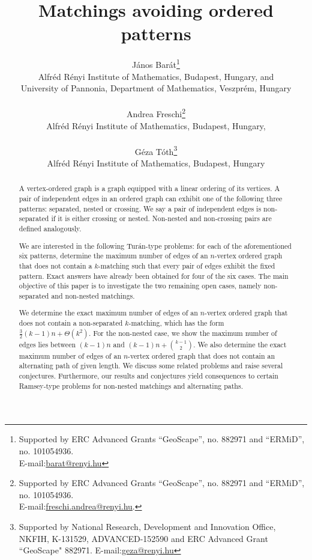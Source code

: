 \documentclass[11pt]{article}
\title{Matchings avoiding ordered patterns}
\author{János Barát\thanks{Supported by ERC Advanced Grants “GeoScape”, no. 882971 and “ERMiD”, no. 101054936.\\
E-mail:\protect\href{mailto:freschi.andrea@renyi.hu}{barat@renyi.hu}
}\\
\small Alfréd R\'enyi Institute of Mathematics, Budapest, Hungary, and\\
\small University of Pannonia, Department of Mathematics, Veszprém, Hungary\\
\\
Andrea Freschi\thanks{
Supported by ERC Advanced Grants “GeoScape”, no. 882971 and “ERMiD”, no. 101054936.\\
E-mail:\protect\href{mailto:freschi.andrea@renyi.hu}{freschi.andrea@renyi.hu}.}\\
\small Alfréd R\'enyi Institute of Mathematics, Budapest, Hungary,\\ 
\\
Géza Tóth\thanks{
Supported by National Research, Development and Innovation Office, NKFIH,
K-131529, ADVANCED-152590 and ERC Advanced Grant “GeoScape" 882971.
E-mail:\protect\href{mailto:freschi.andrea@renyi.hu}{geza@renyi.hu}}
\\
\small Alfréd R\'enyi Institute of Mathematics, Budapest, Hungary}
\theoremstyle{definition}
\begin{document}
\maketitle

\begin{abstract}
    A vertex-ordered graph is a graph equipped with a linear ordering of its vertices.
    A pair of independent edges in an ordered graph can exhibit one of the following three patterns: separated, nested or crossing. 
    We say a pair of independent edges is non-separated if it is either crossing or nested.
    Non-nested and non-crossing pairs are defined analogously.
    
    We are interested in the following Tur\'an-type problems: for each of the aforementioned six patterns, determine the maximum number of edges of an $n$-vertex ordered graph that does not contain a $k$-matching such that every pair of edges exhibit the fixed pattern.
    Exact answers have already been obtained for four of the six cases.
    The main objective of this paper is to investigate the two remaining open cases, namely non-separated and non-nested matchings.
    
    We determine the exact maximum number of edges of an $n$-vertex ordered graph that does not contain a non-separated $k$-matching, which has the form $\frac{3}{2}(k-1)n+\Theta(k^2)$. 
    For the non-nested case, we show the maximum number of edges lies between $(k-1)n$ and $(k-1)n+\binom{k-1}{2}$. 
    We also determine the exact maximum number of edges of an $n$-vertex ordered graph that does not contain an alternating path of given length.
    We discuss some related problems and raise several 
    conjectures.
    Furthermore, our results and conjectures yield consequences to certain Ramsey-type problems for non-nested matchings and alternating paths. 

%
\end{abstract}
\end{document}
